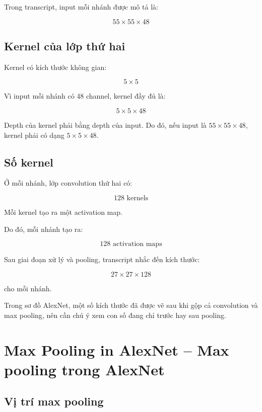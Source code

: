 Trong transcript, input mỗi nhánh được mô tả là:

\[
    55\times55\times48
\]

\subsection{Kernel của lớp thứ hai}

Kernel có kích thước không gian:

\[
    5\times5
\]

Vì input mỗi nhánh có 48 channel, kernel đầy đủ là:

\[
    5\times5\times48
\]

\begin{ghinho}
Depth của kernel phải bằng depth của input. Do đó, nếu input là $55\times55\times48$, kernel phải có dạng $5\times5\times48$.
\end{ghinho}

\subsection{Số kernel}

Ở mỗi nhánh, lớp convolution thứ hai có:

\[
    128 \text{ kernels}
\]

Mỗi kernel tạo ra một activation map.

Do đó, mỗi nhánh tạo ra:

\[
    128 \text{ activation maps}
\]

Sau giai đoạn xử lý và pooling, transcript nhắc đến kích thước:

\[
    27\times27\times128
\]

cho mỗi nhánh.

\begin{luuy}
Trong sơ đồ AlexNet, một số kích thước đã được vẽ sau khi gộp cả convolution và max pooling, nên cần chú ý xem con số đang chỉ trước hay sau pooling.
\end{luuy}

\section{Max Pooling in AlexNet -- Max pooling trong AlexNet}

\subsection{Vị trí max pooling}

